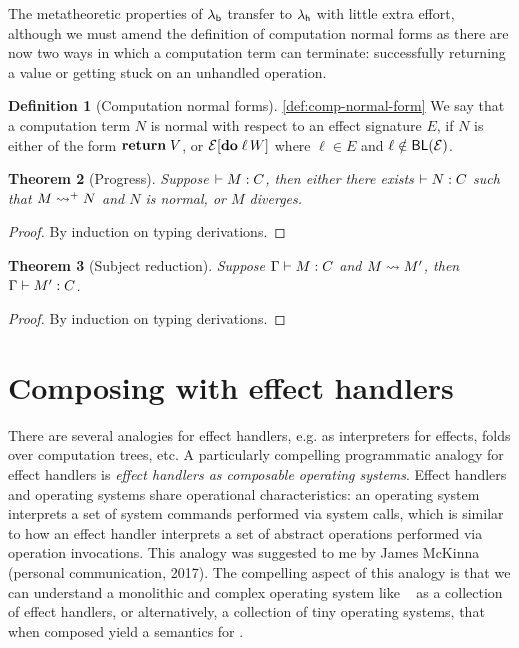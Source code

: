 \documentclass[12pt,phd,lfcs,twoside,openright,logo,leftchapter,normalheadings]{infthesis}
\theoremstyle{plain}
\newtheorem{theorem}{Theorem}[chapter]
\theoremstyle{definition}
\newtheorem{definition}[theorem]{Definition}
\begin{document}
The metatheoretic properties of $\lambda_{\mathsf{b}}$ transfer to $\lambda_{\mathsf{h}}$ with
little extra effort, although we must amend the definition of
computation normal forms as there are now two ways in which a
computation term can terminate: successfully returning a value or
getting stuck on an unhandled operation.
%
\begin{definition}[Computation normal forms]\ref{def:comp-normal-form}
  We say that a computation term $N$ is normal with respect to an
  effect signature $E$, if $N$ is either of the form $\mathbf{return}\;V$, or
  $\mathcal{E}[\mathbf{do}\;\ell\,W]$ where $\ell \in E$ and $\ell \notin \mathsf{BL}(\mathcal{E})$.
\end{definition}
%

\begin{theorem}[Progress]
  Suppose $\vdash M : C$, then either there exists $\vdash N : C$
  such that $M \leadsto^+ N$ and $N$ is normal, or $M$ diverges.
\end{theorem}
%
\begin{proof}
  By induction on typing derivations.
\end{proof}
%
\begin{theorem}[Subject reduction]
  Suppose $\Gamma \vdash M : C$ and $M \leadsto M'$, then
  $\Gamma \vdash M' : C$.
\end{theorem}
%
\begin{proof}
  By induction on typing derivations.
\end{proof}

\section{Composing \UNIX{} with effect handlers}
\label{sec:deep-handlers-in-action}

There are several analogies for effect handlers, e.g. as interpreters
for effects, folds over computation trees, etc. A particularly
compelling programmatic analogy for effect handlers is \emph{effect
  handlers as composable operating systems}. Effect handlers and
operating systems share operational characteristics: an operating
system interprets a set of system commands performed via system calls,
which is similar to how an effect handler interprets a set of abstract
operations performed via operation invocations. This analogy was
suggested to me by James McKinna (personal communication, 2017).
%
The compelling aspect of this analogy is that we can understand a
monolithic and complex operating system like \UNIX{}~\cite{RitchieT74}
as a collection of effect handlers, or alternatively, a collection of
tiny operating systems, that when composed yield a semantics for
\UNIX{}.
\end{document}
